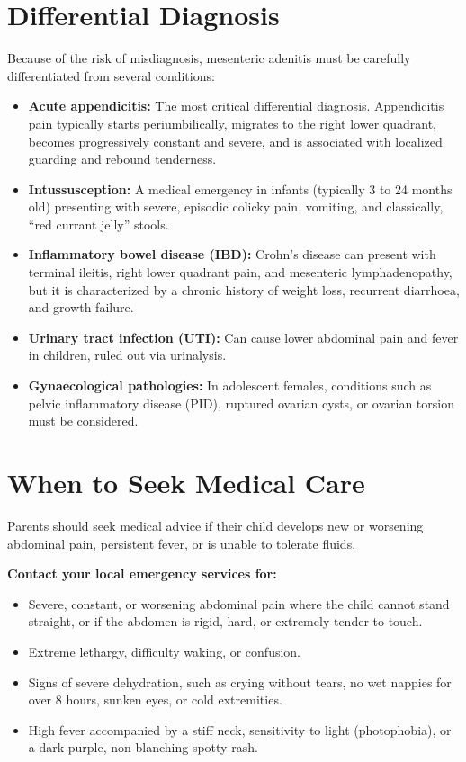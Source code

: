 \section*{Differential Diagnosis}
Because of the risk of misdiagnosis, mesenteric adenitis must be carefully differentiated from several conditions:
\begin{itemize}
    \item \textbf{Acute appendicitis:} The most critical differential diagnosis. Appendicitis pain typically starts periumbilically, migrates to the right lower quadrant, becomes progressively constant and severe, and is associated with localized guarding and rebound tenderness.
    \item \textbf{Intussusception:} A medical emergency in infants (typically 3 to 24 months old) presenting with severe, episodic colicky pain, vomiting, and classically, ``red currant jelly'' stools.
    \item \textbf{Inflammatory bowel disease (IBD):} Crohn's disease can present with terminal ileitis, right lower quadrant pain, and mesenteric lymphadenopathy, but it is characterized by a chronic history of weight loss, recurrent diarrhoea, and growth failure.
    \item \textbf{Urinary tract infection (UTI):} Can cause lower abdominal pain and fever in children, ruled out via urinalysis.
    \item \textbf{Gynaecological pathologies:} In adolescent females, conditions such as pelvic inflammatory disease (PID), ruptured ovarian cysts, or ovarian torsion must be considered.
\end{itemize}

\section*{When to Seek Medical Care}
Parents should seek medical advice if their child develops new or worsening abdominal pain, persistent fever, or is unable to tolerate fluids.

\textbf{Contact your local emergency services for:}
\begin{itemize}
    \item Severe, constant, or worsening abdominal pain where the child cannot stand straight, or if the abdomen is rigid, hard, or extremely tender to touch.
    \item Extreme lethargy, difficulty waking, or confusion.
    \item Signs of severe dehydration, such as crying without tears, no wet nappies for over 8 hours, sunken eyes, or cold extremities.
    \item High fever accompanied by a stiff neck, sensitivity to light (photophobia), or a dark purple, non-blanching spotty rash.
\end{itemize}

